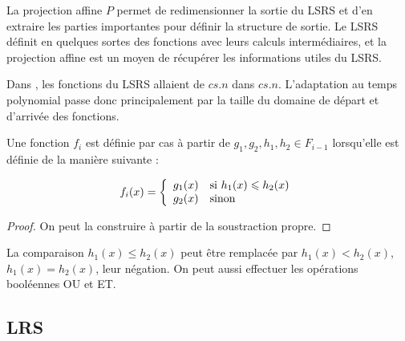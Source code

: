 			La projection affine $P$ permet de redimensionner la sortie du LSRS et d'en extraire les parties importantes pour définir la structure de sortie. Le LSRS définit en quelques sortes des fonctions avec leurs calculs intermédiaires, et la projection affine est un moyen de récupérer les informations utiles du LSRS.
			
			Dans \cite{GrandjeanSchwentick2002}, les fonctions du LSRS allaient de $c s.n$ dans $c s.n$. L'adaptation au temps polynomial passe donc principalement par la taille du domaine de départ et d'arrivée des fonctions.
			

			
			
			
			
			
			
			
			\begin{definition}
				Une fonction $f_i$ est définie par cas à partir de $g_1, g_2, h_1, h_2 \in F_{i-1}$ lorsqu'elle est définie de la manière suivante :
				
				\[
				f_i(x) = \left\lbrace \begin{array}{ll} 
				g_1(x) & \text{si $h_1(x) \leqslant h_2(x)$} \\
				g_2(x) & \text{sinon}
				 \end{array} \right.
				\]
			\end{definition}
			
			
			\begin{proof}
				On peut la construire à partir de la soustraction propre.
			\end{proof}
			
			\begin{remark}
				La comparaison $h_1(x) \leqslant h_2(x)$ peut être remplacée par $h_1(x) < h_2(x)$, $h_1(x) = h_2(x)$, leur négation. On peut aussi effectuer les opérations booléennes OU et ET.
			\end{remark}
			
		
		
		\subsection{LRS} %
		\label{subsec:LRS}
		
